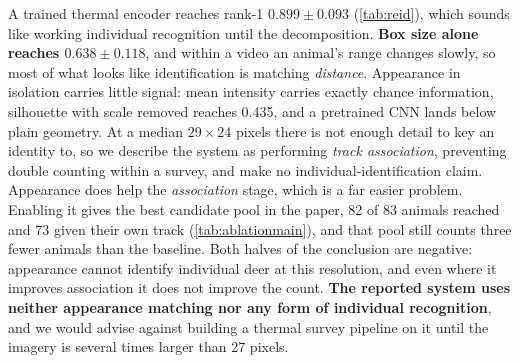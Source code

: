 A trained thermal encoder reaches rank-1 $0.899 \pm 0.093$ (\cref{tab:reid}), which sounds
like working individual recognition until the decomposition. \textbf{Box size alone reaches
$0.638 \pm 0.118$}, and within a video an animal's range changes slowly, so most of what
looks like identification is matching \emph{distance}. Appearance in isolation carries
little signal: mean intensity carries exactly chance information, silhouette with scale
removed reaches 0.435, and a pretrained CNN lands below plain geometry. At a median
$29\times24$ pixels there is not enough detail to key an identity to, so we describe the
system as performing \emph{track association}, preventing double counting within a survey,
and make no individual-identification claim. Appearance does help the \emph{association}
stage, which is a far easier problem. Enabling it gives the best candidate pool in the
paper, 82 of 83 animals reached and 73 given their own track (\cref{tab:ablationmain}), and
that pool still counts three fewer animals than the baseline. Both halves of the conclusion are negative: appearance cannot identify individual
deer at this resolution, and even where it improves association it does not improve the
count. \textbf{The reported system uses neither appearance matching nor any form of
individual recognition}, and we would advise against building a thermal survey pipeline on
it until the imagery is several times larger than 27 pixels.
